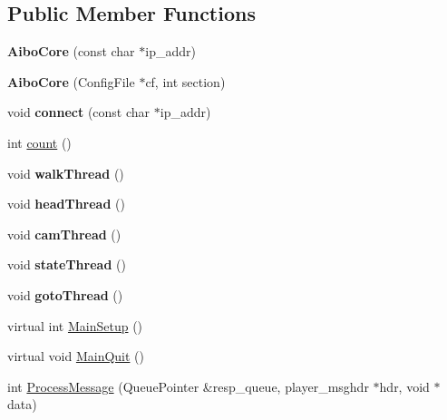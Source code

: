 \subsection*{Public Member Functions}
\begin{DoxyCompactItemize}
\item 
\hypertarget{classAiboCore_a673c057ac82df3fc6c0d828a98408bea}{
{\bfseries AiboCore} (const char $\ast$ip\_\-addr)}
\label{classAiboCore_a673c057ac82df3fc6c0d828a98408bea}

\item 
\hypertarget{classAiboCore_a377640056394d6235609688045288fe7}{
{\bfseries AiboCore} (ConfigFile $\ast$cf, int section)}
\label{classAiboCore_a377640056394d6235609688045288fe7}

\item 
\hypertarget{classAiboCore_a078c3b2541d57e7455094ef7c9e46c80}{
void {\bfseries connect} (const char $\ast$ip\_\-addr)}
\label{classAiboCore_a078c3b2541d57e7455094ef7c9e46c80}

\item 
int \hyperlink{classAiboCore_a7cf6b6a288291b36254dc29ae089d6bc}{count} ()
\item 
\hypertarget{classAiboCore_af0eb13c6a72c46e730436aa44381fd48}{
void {\bfseries walkThread} ()}
\label{classAiboCore_af0eb13c6a72c46e730436aa44381fd48}

\item 
\hypertarget{classAiboCore_ae70c2e145b6975fe54cef1f268de2ccb}{
void {\bfseries headThread} ()}
\label{classAiboCore_ae70c2e145b6975fe54cef1f268de2ccb}

\item 
\hypertarget{classAiboCore_acd2caf3edd957f9f43b6a63d66a165dc}{
void {\bfseries camThread} ()}
\label{classAiboCore_acd2caf3edd957f9f43b6a63d66a165dc}

\item 
\hypertarget{classAiboCore_ad19823ff4435b79e6bd84cf8f96f149a}{
void {\bfseries stateThread} ()}
\label{classAiboCore_ad19823ff4435b79e6bd84cf8f96f149a}

\item 
\hypertarget{classAiboCore_a51fa7abf9b68aa55583b937cabb7ae6e}{
void {\bfseries gotoThread} ()}
\label{classAiboCore_a51fa7abf9b68aa55583b937cabb7ae6e}

\item 
virtual int \hyperlink{classAiboCore_a940aa3f41c521cfc8e1ea69b8a616648}{MainSetup} ()
\item 
virtual void \hyperlink{classAiboCore_a4a06b4d7957998e00ffa662ff9345662}{MainQuit} ()
\item 
int \hyperlink{classAiboCore_a2612cdb01d22f3b18fa0c42ec15b4525}{ProcessMessage} (QueuePointer \&resp\_\-queue, player\_\-msghdr $\ast$hdr, void $\ast$data)
\end{DoxyCompactItemize}
